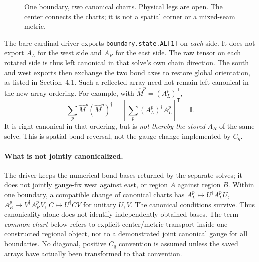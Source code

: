 \documentclass[11pt]{article}
\newcommand{\id}{\mathbb I}
\newcommand{\code}[1]{{\small\nolinkurl{#1}}}
\begin{document}
\begin{figure}[htbp]\centering
{}
\caption{One boundary, two canonical charts. Physical legs are open. The
center connects the charts; it is not a spatial corner or a mixed-seam metric.}
\end{figure}

The bare cardinal driver exports \code{boundary.state.AL[1]} on \emph{each}
side. It does not export $A_L$ for the west side and $A_R$ for the east side.
The raw tensor on each rotated side is thus left canonical in that solve's
own chain direction. The south and west exports then exchange the two bond
axes to restore global orientation, as listed in Section~4.1. Such a reflected
array need not remain left canonical in the new array ordering.
For example, with $\widehat M^p=(A_L^p)^{\mathsf T}$,
\begin{equation}
 \sum_p\widehat M^p(\widehat M^p)^\dagger
 =\left[\sum_p(A_L^p)^\dagger A_L^p\right]^{\mathsf T}=\id.
\end{equation}
It is right canonical in that ordering, but is \emph{not thereby the stored}
$A_R$ of the same solve. This is spatial bond reversal, not the gauge change
implemented by $C_q$.

\paragraph{What is not jointly canonicalized.}
The driver keeps the numerical bond bases returned by the separate solves;
it does not jointly gauge-fix west against east, or region $A$ against region
$B$. Within one boundary, a compatible change of canonical charts has
$A_L^p\mapsto U^\dagger A_L^pU$, $A_R^p\mapsto V^\dagger A_R^pV$,
$C\mapsto U^\dagger CV$ for unitary $U,V$. The canonical conditions survive.
Thus canonicality alone does not identify independently obtained bases.
The term \emph{common chart} below refers to explicit center/metric transport
inside one constructed regional object, not to a demonstrated joint canonical
gauge for all boundaries. No diagonal, positive $C_q$ convention is assumed
unless the saved arrays have actually been transformed to that convention.
\end{document}
